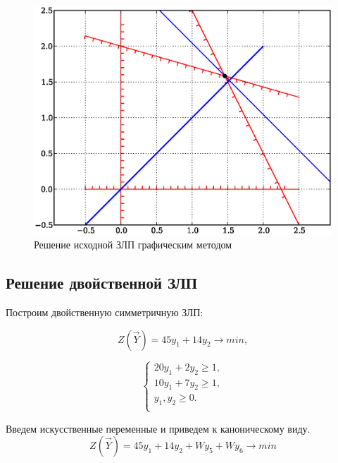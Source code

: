 \begin{figure}[ht]
\centering
\includegraphics[width=\textwidth]{img/11}
\caption{Решение исходной ЗЛП графическим методом}
\end{figure}

\subsection{Решение двойственной ЗЛП}
Построим двойственную симметричную ЗЛП:

\begin{equation}
	Z(\vec{Y}) = 45 y_1 + 14y_2 \to min,
\end{equation}

\begin{equation}
\begin{cases}
20y_1 + 2y_2 \ge 1, \\
10y_1 + 7y_2 \ge 1, \\
y_1, y_2 \ge 0. \\
\end{cases}
\end{equation}

Введем искусственные переменные и приведем к каноническому виду.
\begin{equation}
	Z(\vec{Y}) = 45y_1+14y_2+Wy_5+Wy_6 \to min
\end{equation}

